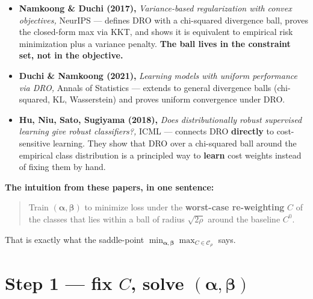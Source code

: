 \documentclass[11pt,a4paper]{article}
\begin{document}
\begin{itemize}[leftmargin=*,itemsep=2pt]
  \item \textbf{Namkoong \& Duchi (2017),} \emph{Variance-based regularization with convex objectives,} NeurIPS --- defines DRO with a chi-squared divergence ball, proves the closed-form max via KKT, and shows it is equivalent to empirical risk minimization plus a variance penalty. \textbf{The ball lives in the constraint set, not in the objective.}
  \item \textbf{Duchi \& Namkoong (2021),} \emph{Learning models with uniform performance via DRO,} Annals of Statistics --- extends to general divergence balls (chi-squared, KL, Wasserstein) and proves uniform convergence under DRO.
  \item \textbf{Hu, Niu, Sato, Sugiyama (2018),} \emph{Does distributionally robust supervised learning give robust classifiers?,} ICML --- connects DRO \textbf{directly} to cost-sensitive learning. They show that DRO over a chi-squared ball around the empirical class distribution is a principled way to \textbf{learn} cost weights instead of fixing them by hand.
\end{itemize}

\textbf{The intuition from these papers, in one sentence:}

\begin{quote}
Train $(\boldsymbol{\alpha}, \boldsymbol{\beta})$ to minimize loss under the \textbf{worst-case re-weighting} $C$ of the classes that lies within a ball of radius $\sqrt{2\rho}$ around the baseline $C^0$.
\end{quote}

That is exactly what the saddle-point $\min_{\boldsymbol{\alpha},\boldsymbol{\beta}} \max_{C \in \mathcal{C}_\rho}$ says.

\section{Step 1 --- fix $C$, solve $(\boldsymbol{\alpha}, \boldsymbol{\beta})$}
\end{document}
